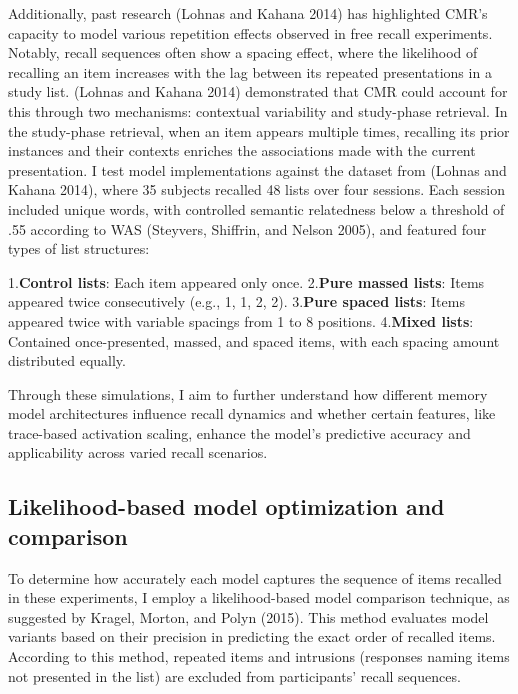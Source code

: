 \documentclass[
  letterpaper,
  11pt,
  english,
  singlespacing,
  headsepline]{MastersDoctoralThesis}
\begin{document}
Additionally, past research (Lohnas and Kahana 2014) has highlighted
CMR's capacity to model various repetition effects observed in free
recall experiments. Notably, recall sequences often show a spacing
effect, where the likelihood of recalling an item increases with the lag
between its repeated presentations in a study list. (Lohnas and Kahana
2014) demonstrated that CMR could account for this through two
mechanisms: contextual variability and study-phase retrieval. In the
study-phase retrieval, when an item appears multiple times, recalling
its prior instances and their contexts enriches the associations made
with the current presentation. I test model implementations against the
dataset from (Lohnas and Kahana 2014), where 35 subjects recalled 48
lists over four sessions. Each session included unique words, with
controlled semantic relatedness below a threshold of .55 according to
WAS (Steyvers, Shiffrin, and Nelson 2005), and featured four types of
list structures:

1.\textbf{Control lists}: Each item appeared only once. 2.\textbf{Pure
massed lists}: Items appeared twice consecutively (e.g., 1, 1, 2, 2).
3.\textbf{Pure spaced lists}: Items appeared twice with variable
spacings from 1 to 8 positions. 4.\textbf{Mixed lists}: Contained
once-presented, massed, and spaced items, with each spacing amount
distributed equally.

Through these simulations, I aim to further understand how different
memory model architectures influence recall dynamics and whether certain
features, like trace-based activation scaling, enhance the model's
predictive accuracy and applicability across varied recall scenarios.

\subsection{Likelihood-based model optimization and
comparison}\label{likelihood-based-model-optimization-and-comparison}

To determine how accurately each model captures the sequence of items
recalled in these experiments, I employ a likelihood-based model
comparison technique, as suggested by Kragel, Morton, and Polyn (2015).
This method evaluates model variants based on their precision in
predicting the exact order of recalled items. According to this method,
repeated items and intrusions (responses naming items not presented in
the list) are excluded from participants' recall sequences.
\end{document}
